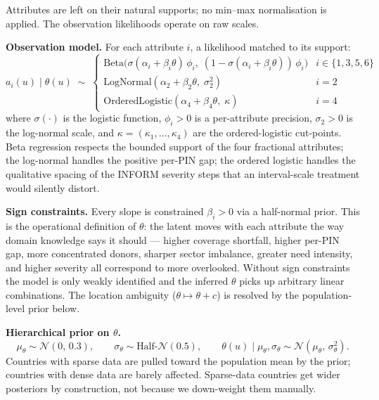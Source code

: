 \documentclass[11pt,a4paper]{article}
\begin{document}
Attributes are left on their natural supports; no min--max normalisation is
applied. The observation likelihoods operate on raw scales.

\textbf{Observation model.} For each attribute $i$, a likelihood matched to
its support:
\begin{equation}
a_i(u) \mid \theta(u) \;\sim\;
\begin{cases}
\text{Beta}\bigl(\sigma(\alpha_i + \beta_i\theta)\,\phi_i,\;
                  (1 - \sigma(\alpha_i + \beta_i\theta))\,\phi_i\bigr)
  & i \in \{1, 3, 5, 6\} \\[0.25em]
\text{LogNormal}(\alpha_2 + \beta_2\theta,\; \sigma_2^2)
  & i = 2 \\[0.25em]
\text{OrderedLogistic}(\alpha_4 + \beta_4\theta,\; \kappa)
  & i = 4
\end{cases}
\label{eq:obs}
\end{equation}
where $\sigma(\cdot)$ is the logistic function, $\phi_i > 0$ is a per-attribute
precision, $\sigma_2 > 0$ is the log-normal scale, and
$\kappa = (\kappa_1, \ldots, \kappa_4)$ are the ordered-logistic cut-points.
Beta regression respects the bounded support of the four fractional attributes;
the log-normal handles the positive per-PIN gap; the ordered logistic handles
the qualitative spacing of the INFORM severity steps that an interval-scale
treatment would silently distort.

\textbf{Sign constraints.} Every slope is constrained $\beta_i > 0$ via a
half-normal prior. This is the operational definition of $\theta$: the latent
moves with each attribute the way domain knowledge says it should --- higher
coverage shortfall, higher per-PIN gap, more concentrated donors, sharper
sector imbalance, greater need intensity, and higher severity all correspond
to more overlooked. Without sign constraints the model is only weakly
identified and the inferred $\theta$ picks up arbitrary linear combinations.
The location ambiguity ($\theta \mapsto \theta + c$) is resolved by the
population-level prior below.

\textbf{Hierarchical prior on $\theta$.}
\begin{equation}
\mu_\theta \sim \mathcal{N}(0,\,0.3),\qquad
\sigma_\theta \sim \text{Half-}\mathcal{N}(0.5),\qquad
\theta(u) \mid \mu_\theta, \sigma_\theta \sim \mathcal{N}(\mu_\theta,\,\sigma_\theta^2).
\label{eq:hier}
\end{equation}
Countries with sparse data are pulled toward the population mean by the prior;
countries with dense data are barely affected. Sparse-data countries get wider
posteriors by construction, not because we down-weight them manually.
\end{document}
